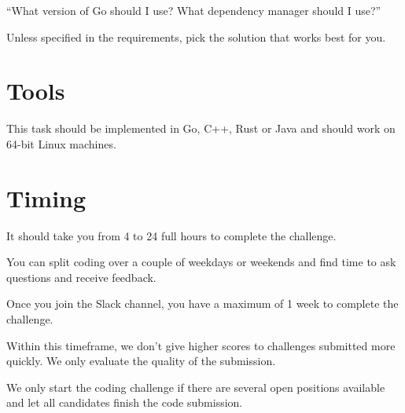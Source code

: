 \documentclass{article}
\begin{document}
``What version of Go should I use? What dependency manager should I use?''

Unless specified in the requirements, pick the solution that works best for you.

\section{Tools}

This task should be implemented in Go, C++, Rust or Java and should work on 64-bit Linux machines.

\section{Timing}

It should take you from 4 to 24 full hours to complete the challenge.

You can split coding over a couple of weekdays or weekends and find time to ask questions and receive feedback.

Once you join the Slack channel, you have a maximum of 1 week to complete the challenge.

Within this timeframe, we don't give higher scores to challenges submitted more quickly.
We only evaluate the quality of the submission.

We only start the coding challenge if there are several open positions available and let
all candidates finish the code submission.
\end{document}
